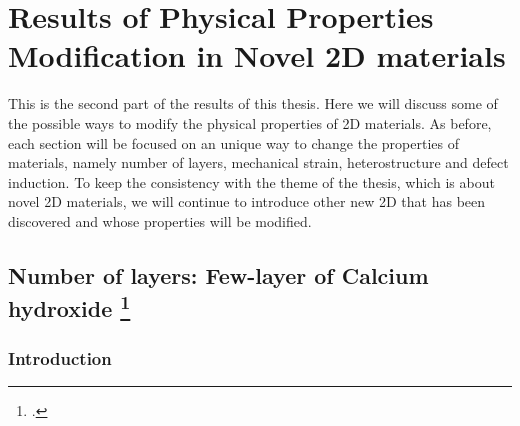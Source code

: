 
\chapter{Results of Physical Properties Modification in Novel 2D materials \label{chap:5}}

\ifpdf
    \graphicspath{{Chapter5/Figs/Raster/}{Chapter5/Figs/PDF/}{Chapter5/Figs/}{Chapter5/Figs/Vector/}}
\else
    \graphicspath{{Chapter5/Figs/Vector/}{Chapter5/Figs/}}
\fi

This is the second part of the results of this thesis. Here we will discuss some of the possible ways to modify the physical properties of 2D materials. As before, each section will be focused on an unique way to change the properties of materials, namely number of layers, mechanical strain, heterostructure and defect induction. To keep the consistency with the theme of the thesis, which is about novel 2D materials, we will continue to introduce other new 2D that has been discovered and whose properties will be modified. 

\section[Number of layers: Few-layer of Calcium hydroxide]{Number of layers: Few-layer of Calcium hydroxide \footcite[This work is published in:][]{Aierken2015.porlandite} \label{CaOH2_layers}}

\subsection{Introduction}

